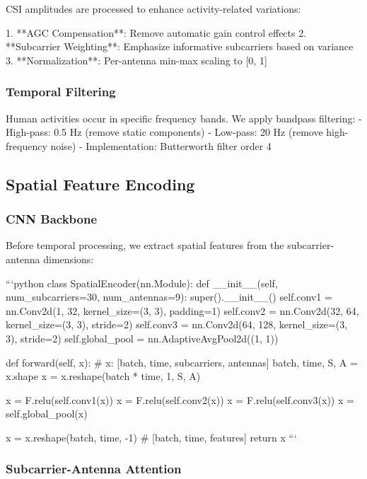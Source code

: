 \documentclass[10pt,journal,compsoc]{IEEEtran}
\begin{document}
CSI amplitudes are processed to enhance activity-related variations:

1. **AGC Compensation**: Remove automatic gain control effects
2. **Subcarrier Weighting**: Emphasize informative subcarriers based on variance
3. **Normalization**: Per-antenna min-max scaling to [0, 1]

\subsubsection{Temporal Filtering}

Human activities occur in specific frequency bands. We apply bandpass filtering:
- High-pass: 0.5 Hz (remove static components)
- Low-pass: 20 Hz (remove high-frequency noise)
- Implementation: Butterworth filter order 4

\subsection{Spatial Feature Encoding}

\subsubsection{CNN Backbone}

Before temporal processing, we extract spatial features from the subcarrier-antenna dimensions:

```python
class SpatialEncoder(nn.Module):
    def __init__(self, num_subcarriers=30, num_antennas=9):
        super().__init__()
        self.conv1 = nn.Conv2d(1, 32, kernel_size=(3, 3), padding=1)
        self.conv2 = nn.Conv2d(32, 64, kernel_size=(3, 3), stride=2)
        self.conv3 = nn.Conv2d(64, 128, kernel_size=(3, 3), stride=2)
        self.global_pool = nn.AdaptiveAvgPool2d((1, 1))
        
    def forward(self, x):
        # x: [batch, time, subcarriers, antennas]
        batch, time, S, A = x.shape
        x = x.reshape(batch * time, 1, S, A)
        
        x = F.relu(self.conv1(x))
        x = F.relu(self.conv2(x))
        x = F.relu(self.conv3(x))
        x = self.global_pool(x)
        
        x = x.reshape(batch, time, -1)  # [batch, time, features]
        return x
```

\subsubsection{Subcarrier-Antenna Attention}
\end{document}
